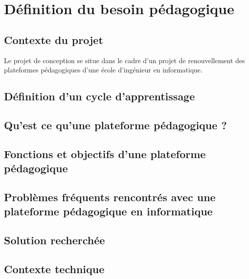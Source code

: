 \section{Définition du besoin pédagogique}

\subsection{Contexte du projet}

Le projet de conception se situe dans le cadre d'un projet de renouvellement des plateformes pédagogiques d'une école d'ingénieur en informatique.\\

\subsection{Définition d'un cycle d'apprentissage}

\subsection{Qu'est ce qu'une plateforme pédagogique ?}

\subsection{Fonctions et objectifs d'une plateforme pédagogique}

\subsection{Problèmes fréquents rencontrés avec une plateforme pédagogique en informatique}

\subsection{Solution recherchée}

\subsection{Contexte technique}